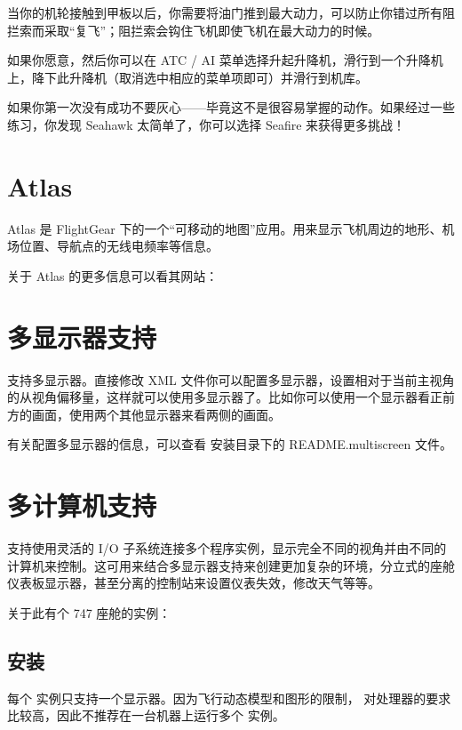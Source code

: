 当你的机轮接触到甲板以后，你需要将油门推到最大动力，可以防止你错过所有阻拦索而采取“复飞”；阻拦索会钩住飞机即使飞机在最大动力的时候。

如果你愿意，然后你可以在 ATC / AI 菜单选择升起升降机，滑行到一个升降机上，降下此升降机（取消选中相应的菜单项即可）并滑行到机库。

如果你第一次没有成功不要灰心——毕竟这不是很容易掌握的动作。如果经过一些练习，你发现 Seahawk 太简单了，你可以选择 Seafire 来获得更多挑战！

\section{Atlas\label{Atlas}}

Atlas 是 FlightGear 下的一个“可移动的地图”应用。用来显示飞机周边的地形、机场位置、导航点的无线电频率等信息。

关于 Atlas 的更多信息可以看其网站：

\noindent
{}

\section{多显示器支持}

\FlightGear{} 支持多显示器。直接修改 XML 文件你可以配置多显示器，设置相对于当前主视角的从视角偏移量，这样就可以使用多显示器了。比如你可以使用一个显示器看正前方的画面，使用两个其他显示器来看两侧的画面。

有关配置多显示器的信息，可以查看 \FlightGear{} 安装目录下的 README.multiscreen 文件。

\section{多计算机支持}

\FlightGear{} 支持使用灵活的 I/O 子系统连接多个程序实例，显示完全不同的视角并由不同的计算机来控制。这可用来结合多显示器支持来创建更加复杂的环境，分立式的座舱仪表板显示器，甚至分离的控制站来设置仪表失效，修改天气等等。

关于此有个 747 座舱的实例：

\noindent
{}

\subsection{安装}

每个 \FlightGear{} 实例只支持一个显示器。因为飞行动态模型和图形的限制，\FlightGear{} 对处理器的要求比较高，因此不推荐在一台机器上运行多个 \FlightGear{} 实例。

